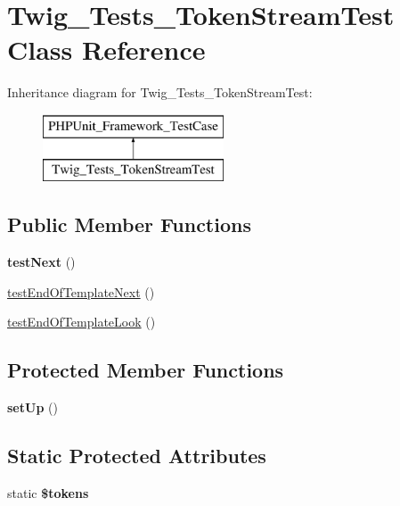 \hypertarget{classTwig__Tests__TokenStreamTest}{}\section{Twig\+\_\+\+Tests\+\_\+\+Token\+Stream\+Test Class Reference}
\label{classTwig__Tests__TokenStreamTest}
Inheritance diagram for Twig\+\_\+\+Tests\+\_\+\+Token\+Stream\+Test\+:\begin{figure}[H]
\begin{center}
\leavevmode
\includegraphics[height=2.000000cm]{classTwig__Tests__TokenStreamTest}
\end{center}
\end{figure}
\subsection*{Public Member Functions}
\begin{DoxyCompactItemize}
\item 
{\bfseries test\+Next} ()\hypertarget{classTwig__Tests__TokenStreamTest_afa8e256bf3965d7b1fbc4031fa4018df}{}\label{classTwig__Tests__TokenStreamTest_afa8e256bf3965d7b1fbc4031fa4018df}

\item 
\hyperlink{classTwig__Tests__TokenStreamTest_a8cfa5a4e492491df80d228ef0a562612}{test\+End\+Of\+Template\+Next} ()
\item 
\hyperlink{classTwig__Tests__TokenStreamTest_af05e03fd4a6c8d7fdd3a0cecdb568525}{test\+End\+Of\+Template\+Look} ()
\end{DoxyCompactItemize}
\subsection*{Protected Member Functions}
\begin{DoxyCompactItemize}
\item 
{\bfseries set\+Up} ()\hypertarget{classTwig__Tests__TokenStreamTest_a9315171880ca3a3b786122c10363b3c1}{}\label{classTwig__Tests__TokenStreamTest_a9315171880ca3a3b786122c10363b3c1}

\end{DoxyCompactItemize}
\subsection*{Static Protected Attributes}
\begin{DoxyCompactItemize}
\item 
static {\bfseries \$tokens}\hypertarget{classTwig__Tests__TokenStreamTest_a70337dcb76b65cd1acb185a4fb20314a}{}\label{classTwig__Tests__TokenStreamTest_a70337dcb76b65cd1acb185a4fb20314a}

\end{DoxyCompactItemize}


